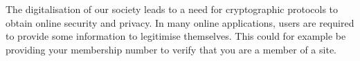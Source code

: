 \begin{comment}
Verifiable homomorphic secret sharing (VHASS) \cite{VHASS} is a protocol that verifies the servers computations is correct in homomorphic secret sharing protocol. 

\section{Previous work}
\cite{DRYNX}<- use for other similar approaches.


In this section the most relevant works which this paper builds upon will be briefly presented.
\subsection*{Verifiable additive homomorphic secret sharing}
This paper aims to extend the Verifiable additive homomorphic secret sharing (VHASS) construction presented in \cite{SumItUp} and further analysed in \cite{VHASS}, to also ensure honest clients. In this section we will give a brief review of their construction for VHASS  based on homomorphic hash functions to verify the servers computations. All details of this protocol can be found in the original paper \cite{SumItUp}.  

The aim of their protocol is to compute the sum $y=f(x_1,...,x_n)=\sum_{i=1}^n x_i$ of $n$ clients input denoted $x_i$ whiling keeping all $x_i$ secret and provide a proof $\sigma$ of the correctness of $y$. Each client split their secret $x_i$ between $m$ servers using homomorphic secret sharing, see section \ref{sec:secret_sharing}, such that no information about $x_i$ is obtained from any proper subset of the shares. The clients also computes and publishes $\tau_i=H(x_i+R_i)$, for a pseudorandom number $R_i$, $\tau_i$ will be used to verify the servers computations. Each servers computes the partial sum $y_j=\sum_{i=1}^n x_{ij}$ and a partial proof $\sigma_j$ and publishes $y_j$ and $\sigma_j$. Then any one can compute the sum of the clients input $y=\sum_{j=1}^m y_j$ and verify this sum is correct using $\sigma_j$ and $\tau_i$. This protocol assumes the clients are honest and does not provide any insurance that the clients input is correct and not malicious. 

\subsection*{Range Proofs}
Range proofs are used to verify that a value is withing a given range without reviling anything more about the value. 
Interactive / non-interactive. Move from general to wich one/ones we will cosider.

\end{comment}
The digitalisation of our society leads to a need for cryptographic protocols to obtain online security and privacy. In many online applications, users are required to provide some information to legitimise themselves. This could for example be providing your membership number to verify that you are a member of a site. 

